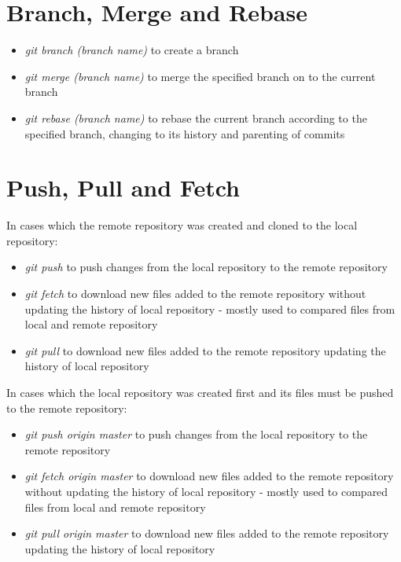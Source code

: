 \documentclass{article}
\begin{document}
\section{Branch, Merge and Rebase}

\begin{itemize}
\item \textit{git branch (branch name)} to create a branch
\item \textit{git merge (branch name)} to merge the specified branch on to the current branch
\item \textit{git rebase (branch name)} to rebase the current branch according to the specified branch, changing to its history and parenting of commits
\end{itemize}


\section{Push, Pull and Fetch}

In cases which the remote repository was created and cloned to the local repository:

\begin{itemize}
    \item \textit{git push} to push changes from the local repository to the remote repository
    \item \textit{git fetch} to download new files added to the remote repository without updating the history of local repository - mostly used to compared files from local and remote repository
    \item \textit{git pull} to download new files added to the remote repository updating the history of local repository
\end{itemize}


In cases which the local repository was created first and its files must be pushed to the remote repository:


\begin{itemize}
	\item \textit{git push origin master} to push changes from the local repository to the remote repository
	\item \textit{git fetch origin master} to download new files added to the remote repository without updating the history of local repository - mostly used to compared files from local and remote repository
	\item \textit{git pull origin master} to download new files added to the remote repository updating the history of local repository
\end{itemize}
\end{document}
